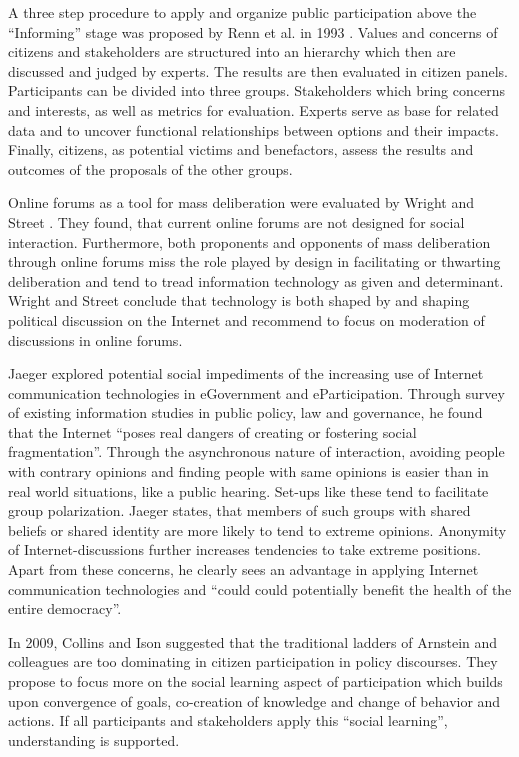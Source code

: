 A three step procedure to apply and organize public participation above the ``Informing'' stage was proposed by Renn et al. in 1993 \cite{Renn1993_participation}. Values and concerns of citizens and stakeholders are structured into an hierarchy which then are discussed and judged by experts. The results are then evaluated in citizen panels. Participants can be divided into three groups. Stakeholders which bring concerns and interests, as well as metrics for evaluation. Experts serve as base for related data and to uncover functional relationships between options and their impacts. Finally, citizens, as potential victims and benefactors, assess the results and outcomes of the proposals of the other groups.

Online forums as a tool for mass deliberation were evaluated by Wright and Street \cite{Wright2007_deliberation_design}. They found, that current online forums are not designed for social interaction. Furthermore, both proponents and opponents of mass deliberation through online forums miss the role played by design in facilitating or thwarting deliberation and tend to tread information technology as given and determinant. Wright and Street conclude that technology is both shaped by and shaping political discussion on the Internet and recommend to focus on moderation of discussions in online forums.

Jaeger \cite{Jaeger2005_deliberate_democracy_and_egovernment} explored potential social impediments of the increasing use of Internet communication technologies in eGovernment and eParticipation. Through survey of existing information studies in public policy, law and governance, he found that the Internet ``poses real dangers of creating or fostering social fragmentation''. Through the asynchronous nature of interaction, avoiding people with contrary opinions and finding people with same opinions is easier than in real world situations, like a public hearing. Set-ups like these tend to facilitate group polarization. Jaeger states, that members of such groups with shared beliefs or shared identity are more likely to tend to extreme opinions. Anonymity of Internet-discussions further increases tendencies to take extreme positions. Apart from these concerns, he clearly sees an advantage in applying Internet communication technologies and ``could could potentially benefit the health of the entire democracy''.




In 2009, Collins and Ison \cite{Collins2009_social_learning} suggested that the traditional ladders of Arnstein and colleagues are too dominating in citizen participation in policy discourses. They propose to focus more on the social learning aspect of participation which builds upon convergence of goals, co-creation of knowledge and change of behavior and actions. If all participants and stakeholders apply this ``social learning'', understanding is supported.









